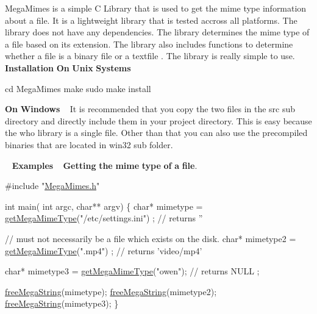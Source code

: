 Mega\+Mimes is a simple C Library that is used to get the mime type information about a file. It is a lightweight library that is tested accross all platforms. The library does not have any dependencies. The library determines the mime type of a file based on its extension. The library also includes functions to determine whether a file is a binary file or a textfile . The library is really simple to use. ~\newline
~\newline
 {\bfseries Installation} {\bfseries On} {\bfseries Unix} {\bfseries Systems} 
\begin{DoxyCode}
cd MegaMimes 
make 
sudo make install 
\end{DoxyCode}


{\bfseries On} {\bfseries Windows} ~\newline
 It is recommended that you copy the two files in the src sub directory and directly include them in your project directory. This is easy because the who library is a single file. Other than that you can also use the precompiled binaries that are located in win32 sub folder.

~\newline
 {\bfseries Examples} ~\newline
 {\bfseries Getting} {\bfseries the} {\bfseries mime} {\bfseries type} {\bfseries of} {\bfseries a} {\bfseries file}.~\newline

\begin{DoxyCode}
\textcolor{preprocessor}{#include "\hyperlink{MegaMimes_8h}{MegaMimes.h}"}
 
 \textcolor{keywordtype}{int} main( \textcolor{keywordtype}{int} argc, \textcolor{keywordtype}{char}** argv)
 \{
    \textcolor{keywordtype}{char}* mimetype  = \hyperlink{MegaMimes_8h_a9fdc19822a29a3903d5687855f4256f6}{getMegaMimeType}(\textcolor{stringliteral}{"/etc/settings.ini"}) ; \textcolor{comment}{// returns ''}
    
    \textcolor{comment}{// must not necessarily be a file which exists on the disk. }
    \textcolor{keywordtype}{char}* mimetype2 = \hyperlink{MegaMimes_8h_a9fdc19822a29a3903d5687855f4256f6}{getMegaMimeType}(\textcolor{stringliteral}{".mp4"}) ; \textcolor{comment}{// returns 'video/mp4'}
    
    \textcolor{keywordtype}{char}* mimetype3 = \hyperlink{MegaMimes_8h_a9fdc19822a29a3903d5687855f4256f6}{getMegaMimeType}(\textcolor{stringliteral}{"owen"}); \textcolor{comment}{// returns NULL ;}

    \hyperlink{MegaMimes_8h_a874430e1d8513e70586046e68907039c}{freeMegaString}(mimetype);
    \hyperlink{MegaMimes_8h_a874430e1d8513e70586046e68907039c}{freeMegaString}(mimetype2);
    \hyperlink{MegaMimes_8h_a874430e1d8513e70586046e68907039c}{freeMegaString}(mimetype3);
 \}
\end{DoxyCode}


